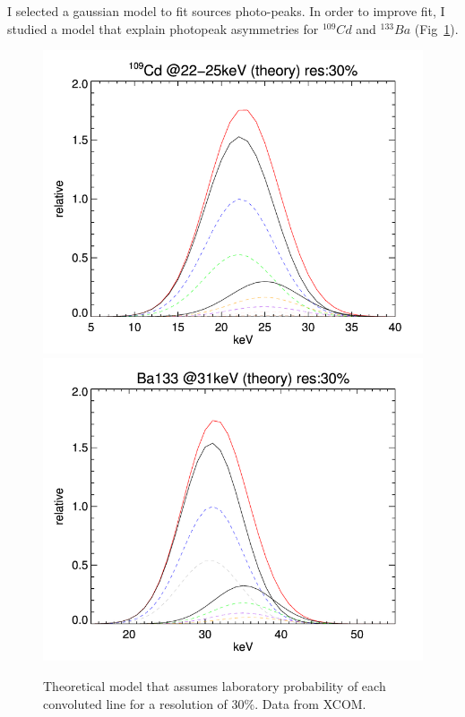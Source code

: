 \documentclass[10pt,a4paper, openany]{book}
\begin{document}
\newpage
I selected a gaussian model to fit sources photo-peaks.
In order to improve fit, I studied a model that explain photopeak asymmetries for $^{109}Cd$ and $^{133}Ba$ (Fig~\ref{fig:th}). 
\begin{figure}[!h]
\begin{center}
\includegraphics[scale=0.2]{imm/22kev_gauss.png}
\includegraphics[scale=0.2]{imm/31kev_gauss.png}
\end{center}
\caption{Theoretical model that assumes laboratory probability of each convoluted line for a resolution of 30\%. Data from XCOM.}
\label{fig:th}
\end{figure}
\end{document}
